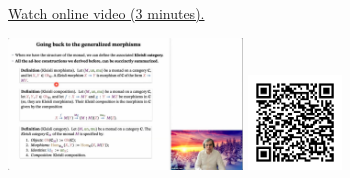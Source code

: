 
\begin{minipage}{10cm}
    \href{https://act4e-spring21.netlify.app/videos/spring2021-monads-a:generalized-morphisms.html}{Watch online video (3 minutes).}
        
    \href{https://act4e-spring21.netlify.app/videos/spring2021-monads-a:generalized-morphisms.html}{\includegraphics[height=3.5cm]{spring2021-monads-a:generalized-morphisms/thumbnails.jpg}}
    \href{https://act4e-spring21.netlify.app/videos/spring2021-monads-a:generalized-morphisms.html}{\includegraphics[height=2.5cm]{spring2021-monads-a:generalized-morphisms/qrcode.png}}
\end{minipage}
